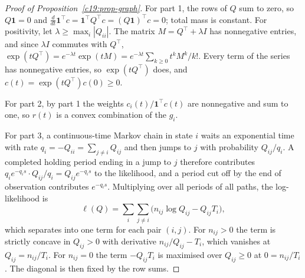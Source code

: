 \begin{proof}[Proof of Proposition~\ref{c19:prop-graph}]
For part 1, the rows of $Q$ sum to zero, so $Q\mathbf 1=0$ and $\frac{d}{dt}\mathbf 1^\top c=\mathbf 1^\top Q^\top c=(Q\mathbf 1)^\top c=0$; total mass is constant. For positivity, let $\lambda\ge\max_i|Q_{ii}|$. The matrix $M=Q^\top+\lambda I$ has nonnegative entries, and since $\lambda I$ commutes with $Q^\top$, $\exp(tQ^\top)=e^{-\lambda t}\exp(tM)=e^{-\lambda t}\sum_{k\ge0}t^kM^k/k!$. Every term of the series has nonnegative entries, so
$\exp(tQ^\top)$ does, and $c(t)=\exp(tQ^\top)c(0)\ge0$.

For part 2, by part 1 the weights $c_i(t)/\mathbf 1^\top c(t)$ are nonnegative and sum to one, so $r(t)$ is
a convex combination of the $g_i$.

For part 3, a continuous-time Markov chain in state $i$ waits an exponential time with rate
$q_i=-Q_{ii}=\sum_{j\ne i}Q_{ij}$ and then jumps to $j$ with probability $Q_{ij}/q_i$. A completed holding
period ending in a jump to $j$ therefore contributes $q_ie^{-q_is}\cdot Q_{ij}/q_i=Q_{ij}e^{-q_is}$ to the likelihood,
and a period cut off by the end of observation contributes $e^{-q_is}$. Multiplying over all periods
of all paths, the log-likelihood is
\[\ell(Q)=\sum_i\sum_{j\ne i}\big(n_{ij}\log Q_{ij}-Q_{ij}T_i\big),\]
which separates into one term for each pair $(i,j)$. For $n_{ij}>0$ the term is strictly concave
in $Q_{ij}>0$ with derivative $n_{ij}/Q_{ij}-T_i$, which vanishes at $Q_{ij}=n_{ij}/T_i$. For $n_{ij}=0$ the
term $-Q_{ij}T_i$ is maximised over $Q_{ij}\ge0$ at $0=n_{ij}/T_i$. The diagonal is then fixed by the row
sums.
\end{proof}
